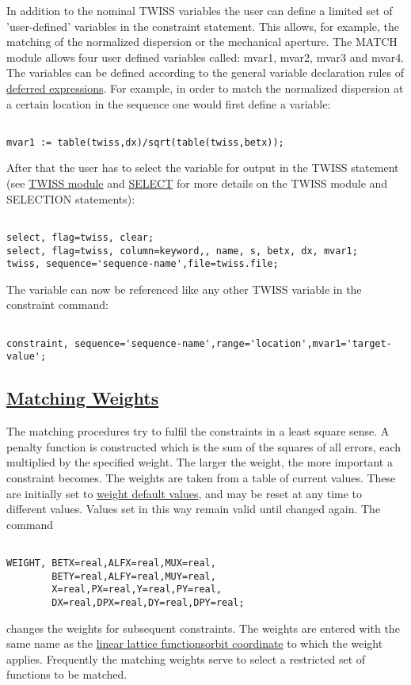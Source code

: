 In addition to the nominal TWISS variables the user can define a 
limited set of 'user-defined' variables in the constraint statement. This allows, for example, the matching of the normalized
dispersion or the mechanical aperture. The MATCH module allows four user defined variables called: mvar1, mvar2, mvar3 and mvar4.
The variables can be defined according to the general variable declaration rules of 
\href{../Introduction/expression.html#defer}{deferred expressions}.
For example, in order to match the normalized dispersion at a certain
location in the sequence one would first define a variable:

\begin{verbatim}

mvar1 := table(twiss,dx)/sqrt(table(twiss,betx));
\end{verbatim}
After that the user has to select the variable for output in the TWISS
statement (see \href{../twiss/twiss.html}{TWISS module} and
\href{../Introduction/select.html}{SELECT} for more
details on the TWISS module and SELECTION statements):

\begin{verbatim}

select, flag=twiss, clear;
select, flag=twiss, column=keyword,, name, s, betx, dx, mvar1;
twiss, sequence='sequence-name',file=twiss.file;
\end{verbatim}
The variable can now be referenced like any other TWISS variable
in the constraint command:

\begin{verbatim}

constraint, sequence='sequence-name',range='location',mvar1='target-value';
\end{verbatim}

\subsection{\href{weight}{Matching Weights}}
The matching procedures try to fulfil the constraints
in a least square sense.
A penalty function is constructed which is the sum of the
squares of all errors,
each multiplied by the specified weight.
The larger the weight, the more important a constraint becomes.
The weights are taken from a table of current values.
These are initially set to \hyperlink{default}{weight default values},
and may be reset at any time to different values.
Values set in this way remain valid until changed again.
The command

\begin{verbatim}

WEIGHT, BETX=real,ALFX=real,MUX=real, 
        BETY=real,ALFY=real,MUY=real, 
        X=real,PX=real,Y=real,PY=real, 
        DX=real,DPX=real,DY=real,DPY=real;
\end{verbatim}
changes the weights for subsequent constraints.
The weights are entered with the same name as the
\href{../Introduction/tables.html#linear}{linear lattice functions}\href{../Introduction/closed_orbit.html}{orbit coordinate}
to which the weight applies.
Frequently the matching weights serve to select a restricted
set of functions to be matched.


